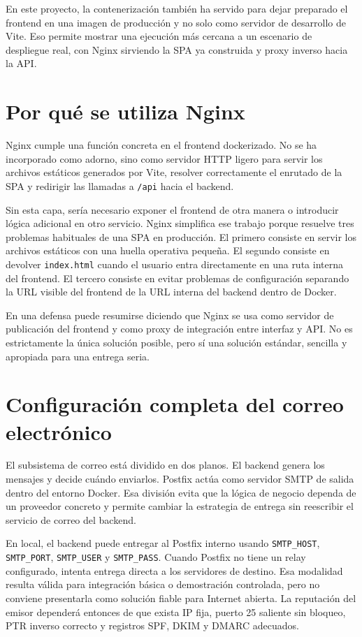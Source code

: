 \documentclass[11pt, a4paper]{article}
\begin{document}
En este proyecto, la contenerización también ha servido para dejar preparado el frontend en una imagen de producción y no solo como servidor de desarrollo de Vite. Eso permite mostrar una ejecución más cercana a un escenario de despliegue real, con Nginx sirviendo la SPA ya construida y proxy inverso hacia la API.

\section{Por qué se utiliza Nginx}

Nginx cumple una función concreta en el frontend dockerizado. No se ha incorporado como adorno, sino como servidor HTTP ligero para servir los archivos estáticos generados por Vite, resolver correctamente el enrutado de la SPA y redirigir las llamadas a \texttt{/api} hacia el backend.

Sin esta capa, sería necesario exponer el frontend de otra manera o introducir lógica adicional en otro servicio. Nginx simplifica ese trabajo porque resuelve tres problemas habituales de una SPA en producción. El primero consiste en servir los archivos estáticos con una huella operativa pequeña. El segundo consiste en devolver \texttt{index.html} cuando el usuario entra directamente en una ruta interna del frontend. El tercero consiste en evitar problemas de configuración separando la URL visible del frontend de la URL interna del backend dentro de Docker.

En una defensa puede resumirse diciendo que Nginx se usa como servidor de publicación del frontend y como proxy de integración entre interfaz y API. No es estrictamente la única solución posible, pero sí una solución estándar, sencilla y apropiada para una entrega seria.

\section{Configuración completa del correo electrónico}

El subsistema de correo está dividido en dos planos. El backend genera los mensajes y decide cuándo enviarlos. Postfix actúa como servidor SMTP de salida dentro del entorno Docker. Esa división evita que la lógica de negocio dependa de un proveedor concreto y permite cambiar la estrategia de entrega sin reescribir el servicio de correo del backend.

En local, el backend puede entregar al Postfix interno usando \texttt{SMTP\_HOST}, \texttt{SMTP\_PORT}, \texttt{SMTP\_USER} y \texttt{SMTP\_PASS}. Cuando Postfix no tiene un relay configurado, intenta entrega directa a los servidores de destino. Esa modalidad resulta válida para integración básica o demostración controlada, pero no conviene presentarla como solución fiable para Internet abierta. La reputación del emisor dependerá entonces de que exista IP fija, puerto 25 saliente sin bloqueo, PTR inverso correcto y registros SPF, DKIM y DMARC adecuados.
\end{document}

